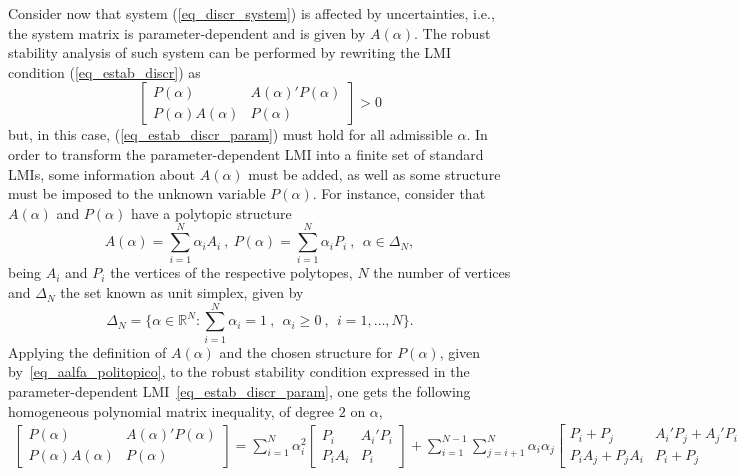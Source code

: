 \documentclass[english,11pt]{article}
\theoremstyle{break} \theorembodyfont{\small\rm}
\begin{document}
Consider now that system (\ref{eq_discr_system}) is affected by uncertainties, i.e., the
system matrix is parameter-dependent and is given by $A(\alpha)$. The robust stability analysis
of such system can be performed by rewriting the LMI condition (\ref{eq_estab_discr}) as
\begin{equation}\label{eq_estab_discr_param}
 \begin{bmatrix} P(\alpha) & A(\alpha)'P(\alpha) \\ P(\alpha)A(\alpha) & P(\alpha) \end{bmatrix} > 0
\end{equation}
but, in this case, (\ref{eq_estab_discr_param}) must hold for all admissible $\alpha$.
In order to transform the parameter-dependent LMI into a finite set of standard
LMIs, some information about $A(\alpha)$ must be added, as well as some structure must
be imposed to the unknown variable $P(\alpha)$.
For instance, consider that $A(\alpha)$ and $P(\alpha)$ have a polytopic structure
\begin{equation}\label{eq_aalfa_politopico}
 A(\alpha) = \sum_{i=1}^N \alpha_i A_i~,~P(\alpha) = \sum_{i=1}^N \alpha_i P_i~,~~ \alpha \in \Delta_N,
\end{equation}
being $A_i$ and $P_i$ the vertices of the respective polytopes, $N$ the number of 
vertices and $\Delta_N$ the set known as unit simplex, given by
\begin{equation}\label{eq_unit_simplex}
 \Delta_N = \big\{ \alpha \in \mathbb{R}^N : \sum_{i=1}^N \alpha_i = 1~,~~ 
\alpha_i \geq 0~,~~ i = 1,\ldots,N \big\}.
\end{equation}
Applying the definition of $A(\alpha)$ and the chosen structure for $P(\alpha)$, given by~\eqref{eq_aalfa_politopico},
to the robust stability condition expressed in the parameter-dependent LMI~\eqref{eq_estab_discr_param}, one gets
the following homogeneous polynomial matrix inequality, of degree $2$ on $\alpha$, 
\begin{multline}\label{eq_poly_lmi}
 \begin{bmatrix} P(\alpha) & A(\alpha)'P(\alpha) \\ P(\alpha)A(\alpha) & P(\alpha) \end{bmatrix} = 
\sum_{i=1}^N \alpha_i^2 \begin{bmatrix} P_i & A_i'P_i \\ P_iA_i & P_i \end{bmatrix} 
+ \sum_{i=1}^{N-1} \sum_{j=i+1}^N \alpha_i\alpha_j \begin{bmatrix} P_i + P_j & A_i'P_j + A_j'P_i \\ P_iA_j + P_jA_i & P_i + P_j \end{bmatrix} > 0. 
\end{multline}
\end{document}
